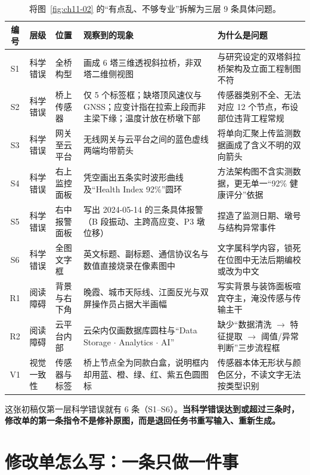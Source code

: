 \begin{table}[htbp]\centering\footnotesize
\setlength{\tabcolsep}{3pt}
\renewcommand{\arraystretch}{1.15}
\caption{将图~\ref{fig:ch11-02} 的“有点乱、不够专业”拆解为三层 9 条具体问题。}\label{tab:ch11-01}
\begin{tabularx}{\linewidth}{@{}c>{\raggedright\arraybackslash}p{17mm}>{\raggedright\arraybackslash}p{22mm}YY@{}}
\toprule
\textbf{编号} & \textbf{层级} & \textbf{位置} & \textbf{观察到的现象} & \textbf{为什么是问题} \\
\midrule
S1 & 科学错误 & 全桥构型 & 画成 6 塔三维透视斜拉桥，非双塔二维侧视图 & 与研究设定的双塔斜拉桥架构及立面工程制图不符 \\
S2 & 科学错误 & 桥上传感器 & 仅 5 个标签框；缺塔顶风速仪与 GNSS；应变计指在拉索上段而非主梁下缘；温度计放在桥墩下部 & 传感器类别不全、无法对应 12 个节点，布设部位违背工程常规 \\
S3 & 科学错误 & 网关至云平台 & 无线网关与云平台之间的蓝色虚线两端均带箭头 & 将单向汇聚上传监测数据画成了含义不明的双向箭头 \\
S4 & 科学错误 & 右上监控面板 & 凭空画出五条实时波形曲线及“Health Index 92\%”圆环 & 方法架构图不含实测数据，更无单一“92\% 健康评分”依据 \\
S5 & 科学错误 & 右中报警面板 & 写出 2024-05-14 的三条具体报警（B 段振动、主跨高应变、P3 墩位移） & 捏造了监测日期、墩号与结构异常事件 \\
S6 & 科学错误 & 全图文字框 & 英文标题、副标题、通信协议名与数值直接烧录在像素图中 & 文字属科学内容，锁死在位图中无法后期编校或改为中文 \\
R1 & 阅读障碍 & 背景与右下角 & 晚霞、城市天际线、江面反光与双屏操作员占据大半画幅 & 写实背景与装饰面板喧宾夺主，淹没传感与传输主干 \\
R2 & 阅读障碍 & 云平台内部 & 云朵内仅画数据库圆柱与“Data Storage $\cdot$ Analytics $\cdot$ AI” & 缺少“数据清洗 $\rightarrow$ 特征提取 $\rightarrow$ 阈值/异常判断”三步流程框 \\
V1 & 视觉一致性 & 传感器与标签 & 桥上节点全为同款白盒，说明框内却用蓝、橙、绿、红、紫五色圆图标 & 传感器本体无形状与颜色区分，不读文字无法按类型识别 \\
\bottomrule
\end{tabularx}
\end{table}

这张初稿仅第一层科学错误就有 6 条（S1--S6）。\textbf{当科学错误达到或超过三条时，修改单的第一条指令不是修补原图，而是退回任务书重写输入、重新生成。}

\section{修改单怎么写：一条只做一件事}

